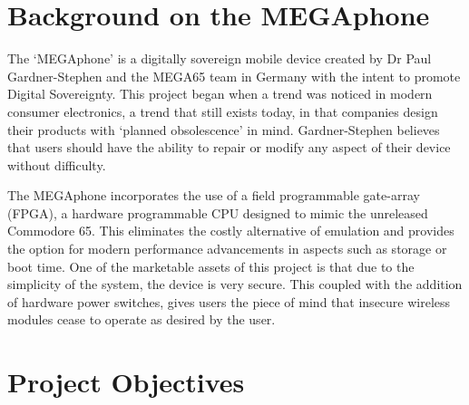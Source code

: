 
\section{Background on the MEGAphone}

The ‘MEGAphone’ is a digitally sovereign mobile device created by Dr Paul Gardner-Stephen and the MEGA65 team in Germany with the intent to promote Digital Sovereignty\cite{mega65}.
This project began when a trend was noticed in modern consumer electronics, a trend that still exists today, in that companies design their products with ‘planned obsolescence’ in mind. 
Gardner-Stephen believes that users should have the ability to repair or modify any aspect of their device without difficulty\cite{mobilehistory}.

The MEGAphone incorporates the use of a field programmable gate-array (FPGA), a hardware programmable CPU designed to mimic the unreleased Commodore 65.
This eliminates the costly alternative of emulation and provides the option for modern performance advancements in aspects such as storage or boot time.
One of the marketable assets of this project is that due to the simplicity of the system, the device is very secure.
This coupled with the addition of hardware power switches, gives users the piece of mind that insecure wireless modules cease to operate as desired by the user.


\section{Project Objectives}

